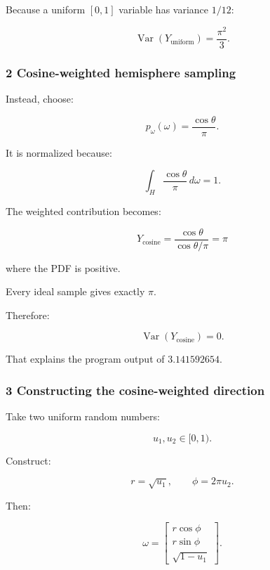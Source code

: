 Because a uniform \([0,1]\) variable has variance \(1/12\):

\[
 \boxed{ \operatorname{Var}(Y_{\mathrm{uniform}}) = \frac{\pi^2}{3} }.
\]

\subsubsection{2 Cosine-weighted hemisphere sampling}\label{02-foundations-ii-ch031-cosine-weighted-hemisphere-sampling}

\hypertarget{02-foundations-ii-ch031-cosine-weighted-hemisphere-sampling}{}

Instead, choose:

\[
 \boxed{ p_\omega(\omega)=\frac{\cos\theta}{\pi} }.
\]

It is normalized because:

\[
 \int_H\frac{\cos\theta}{\pi}\,d\omega=1.
\]

The weighted contribution becomes:

\[
 Y_{\mathrm{cosine}} = \frac{\cos\theta}{\cos\theta/\pi} =\boxed{\pi}
\]

where the PDF is positive.

Every ideal sample gives exactly \(\pi\).

Therefore:

\[
 \boxed{ \operatorname{Var}(Y_{\mathrm{cosine}})=0 }.
\]

That explains the program output of \(3.141592654\).

\subsubsection{3 Constructing the cosine-weighted direction}\label{02-foundations-ii-ch031-constructing-the-cosine-weighted-direction}

\hypertarget{02-foundations-ii-ch031-constructing-the-cosine-weighted-direction}{}

Take two uniform random numbers:

\[
 u_1,u_2\in[0,1).
\]

Construct:

\[
 r=\sqrt{u_1}, \qquad \phi=2\pi u_2.
\]

Then:

\[
 \boxed{ \omega= \begin{bmatrix} r\cos\phi\\ r\sin\phi\\ \sqrt{1-u_1} \end{bmatrix} }.
\]

